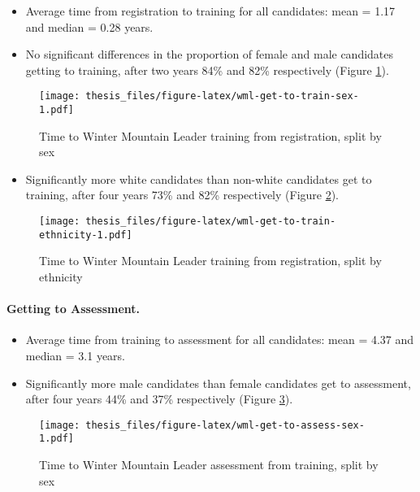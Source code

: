\documentclass[
  12pt,
  a4paper,
]{book}
\providecommand{\tightlist}{%
  \setlength{\itemsep}{0pt}\setlength{\parskip}{0pt}}
\begin{document}
\begin{itemize}
\tightlist
\item
  Average time from registration to training for all candidates: mean = 1.17 and median = 0.28 years.
\item
  No significant differences in the proportion of female and male candidates getting to training, after two years 84\% and 82\% respectively (Figure \ref{fig:wml-get-to-train-sex}).
\end{itemize}

\begin{figure}
\centering
\texttt{[image: thesis\_files/figure-latex/wml-get-to-train-sex-1.pdf]}
\caption{\label{fig:wml-get-to-train-sex}Time to Winter Mountain Leader training from registration, split by sex}
\end{figure}

\begin{itemize}
\tightlist
\item
  Significantly more white candidates than non-white candidates get to training, after four years 73\% and 82\% respectively (Figure \ref{fig:wml-get-to-train-ethnicity}).
\end{itemize}

\begin{figure}
\centering
\texttt{[image: thesis\_files/figure-latex/wml-get-to-train-ethnicity-1.pdf]}
\caption{\label{fig:wml-get-to-train-ethnicity}Time to Winter Mountain Leader training from registration, split by ethnicity}
\end{figure}

\hypertarget{mts-part-a-getting-to-assessment-wml}{%
\paragraph{Getting to Assessment.}\label{mts-part-a-getting-to-assessment-wml}}

\begin{itemize}
\tightlist
\item
  Average time from training to assessment for all candidates: mean = 4.37 and median = 3.1 years.
\item
  Significantly more male candidates than female candidates get to assessment, after four years 44\% and 37\% respectively (Figure \ref{fig:wml-get-to-assess-sex}).
\end{itemize}

\begin{figure}
\centering
\texttt{[image: thesis\_files/figure-latex/wml-get-to-assess-sex-1.pdf]}
\caption{\label{fig:wml-get-to-assess-sex}Time to Winter Mountain Leader assessment from training, split by sex}
\end{figure}
\end{document}
